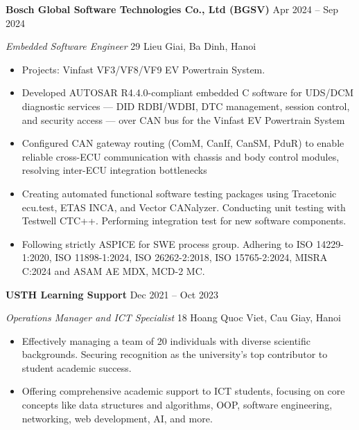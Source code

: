 \documentclass[10pt,a4paper]{article}
\begin{document}
\vspace{2pt}


\textbf{ Bosch Global Software Technologies Co., Ltd (BGSV) }
\hfill
Apr 2024 -- Sep 2024

\textit{ Embedded Software Engineer  }
\hfill
29 Lieu Giai, Ba Dinh, Hanoi

\begin{itemize}[
    leftmargin=2em,
    itemsep=2pt,
    topsep=3pt,
    label=\Large$\bullet$
]

    \item Projects: Vinfast VF3/VF8/VF9 EV Powertrain System.
    \item Developed AUTOSAR R4.4.0-compliant embedded C software for UDS/DCM diagnostic services — DID RDBI/WDBI, DTC management, session control, and security access — over CAN bus for the Vinfast EV Powertrain System
    \item Configured CAN gateway routing (ComM, CanIf, CanSM, PduR) to enable reliable cross-ECU communication with chassis and body control modules, resolving inter-ECU integration bottlenecks
    \item Creating automated functional software testing packages using Tracetonic ecu.test, ETAS INCA, and Vector CANalyzer. Conducting unit testing with Testwell CTC++. Performing integration test for new software components.
    \item Following strictly ASPICE for SWE process group. Adhering to ISO 14229-1:2020, ISO 11898-1:2024, ISO 26262-2:2018, ISO 15765-2:2024, MISRA C:2024 and ASAM AE MDX, MCD-2 MC.

\end{itemize}

\vspace{2pt}


\textbf{ USTH Learning Support }
\hfill
Dec 2021 -- Oct 2023

\textit{ Operations Manager and ICT Specialist }
\hfill
18 Hoang Quoc Viet, Cau Giay, Hanoi

\begin{itemize}[
    leftmargin=2em,
    itemsep=2pt,
    topsep=3pt,
    label=\Large$\bullet$
]

    \item Effectively managing a team of 20 individuals with diverse scientific backgrounds. Securing recognition as the university's top contributor to student academic success.
    \item Offering comprehensive academic support to ICT students, focusing on core concepts like data structures and algorithms, OOP, software engineering, networking, web development, AI,  and more.

\end{itemize}
\end{document}

